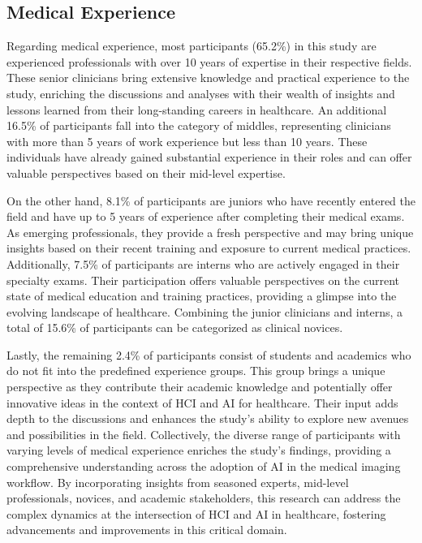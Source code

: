 \subsection{Medical Experience}
\label{chap:app002003001}

Regarding medical experience, most participants (65.2\%) in this study are experienced professionals with over 10 years of expertise in their respective fields.
These senior clinicians bring extensive knowledge and practical experience to the study, enriching the discussions and analyses with their wealth of insights and lessons learned from their long-standing careers in healthcare.
An additional 16.5\% of participants fall into the category of middles, representing clinicians with more than 5 years of work experience but less than 10 years.
These individuals have already gained substantial experience in their roles and can offer valuable perspectives based on their mid-level expertise.

On the other hand, 8.1\% of participants are juniors who have recently entered the field and have up to 5 years of experience after completing their medical exams.
As emerging professionals, they provide a fresh perspective and may bring unique insights based on their recent training and exposure to current medical practices.
Additionally, 7.5\% of participants are interns who are actively engaged in their specialty exams.
Their participation offers valuable perspectives on the current state of medical education and training practices, providing a glimpse into the evolving landscape of healthcare.
Combining the junior clinicians and interns, a total of 15.6\% of participants can be categorized as clinical novices.

Lastly, the remaining 2.4\% of participants consist of students and academics who do not fit into the predefined experience groups.
This group brings a unique perspective as they contribute their academic knowledge and potentially offer innovative ideas in the context of \ac{HCI} and \ac{AI} for healthcare.
Their input adds depth to the discussions and enhances the study's ability to explore new avenues and possibilities in the field.
Collectively, the diverse range of participants with varying levels of medical experience enriches the study's findings, providing a comprehensive understanding across the adoption of \ac{AI} in the medical imaging workflow.
By incorporating insights from seasoned experts, mid-level professionals, novices, and academic stakeholders, this research can address the complex dynamics at the intersection of \ac{HCI} and \ac{AI} in healthcare, fostering advancements and improvements in this critical domain.

